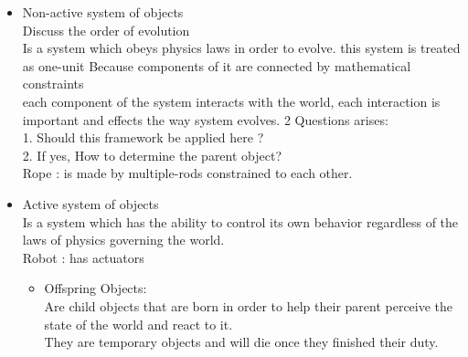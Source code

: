 \documentclass[a4paper]{report}
\newcommand{\cm}[1]{{\color{red}#1}}
\newcommand{\ai}[1]{{\color{blue}#1}}
\newcommand{\eg}[1]{{\color{violet}#1}}
\begin{document}
\begin{itemize}


\item Non-active system of objects \\
\ai{Discuss the order of evolution}\\
Is a system which obeys physics laws in order to evolve.
this system is treated as one-unit Because components of it are connected by mathematical constraints\\
\cm{each component of the system interacts with the world, each interaction is important and effects the way system evolves. 2 Questions arises: \\ 
1. Should this framework be applied here ?\\
2. If yes, How to determine the parent object?
}\\
\eg{Rope : is made by multiple-rods constrained to each other. }

\item Active system of objects\\
Is a system which has the ability to control its own behavior regardless of the laws of physics governing the world.\\
\eg{Robot : has actuators}
	\begin{itemize}
	\item Offspring Objects:\\
Are child objects that are born in order to help their parent perceive the state of the world and react to it.\\
They are temporary objects and will die once they finished their duty.\\

	\end{itemize}


\end{itemize}
\end{document}
